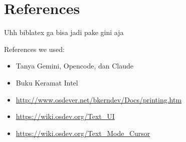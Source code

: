 \chapter{References}

Uhh biblatex ga bisa jadi pake gini aja

References we used:

\begin{itemize}
\item Tanya Gemini, Opencode, dan Claude
\item Buku Keramat Intel
\item \url{http://www.osdever.net/bkerndev/Docs/printing.htm}
\item \url{https://wiki.osdev.org/Text_UI}
\item \url{https://wiki.osdev.org/Text_Mode_Cursor}
\end{itemize}